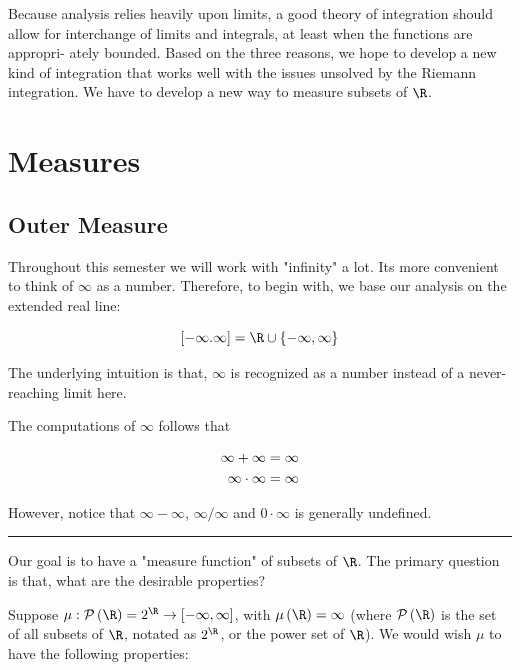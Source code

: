 \documentclass[
]{article}
\begin{document}
Because analysis relies heavily upon limits, a good theory of
integration should allow for interchange of limits and integrals, at
least when the functions are appropri- ately bounded. Based on the three
reasons, we hope to develop a new kind of integration that works well
with the issues unsolved by the Riemann integration. We have to develop
a new way to measure subsets of \(\R\).

\hypertarget{measures}{%
\section{Measures}\label{measures}}

\hypertarget{outer-measure}{%
\subsection{Outer Measure}\label{outer-measure}}

Throughout this semester we will work with "infinity" a lot.
It\textquotesingle s more convenient to think of \(\infty\) as a number.
Therefore, to begin with, we base our analysis on the extended real
line:

\[\br{-\infty.\infty} = \R\cup \brace{-\infty,\infty}\]

The underlying intuition is that, \(\infty\) is recognized as a number
instead of a never-reaching limit here.

The computations of \(\infty\) follows that

\[\begin{aligned}
\infty+\infty & = \infty\\
\infty\cdot \infty & = \infty\\
\end{aligned}\]

However, notice that \(\infty-\infty\), \(\infty/\infty\) and
\(0\cdot \infty\) is generally undefined.

\begin{center}\rule{0.5\linewidth}{0.5pt}\end{center}

Our goal is to have a "measure function" of subsets of \(\R\). The
primary question is that, what are the desirable properties?

Suppose \(\mu:\mathcal P\pr \R = 2^{\R}\to \br{-\infty,\infty}\), with
\(\mu\pr{\R} = \infty\) (where \(\P\pr{\R}\) is the set of all subsets
of \(\R\), notated as \(2^{\R}\), or the power set of \(\R\)). We would
wish \(\mu\) to have the following properties:
\end{document}
